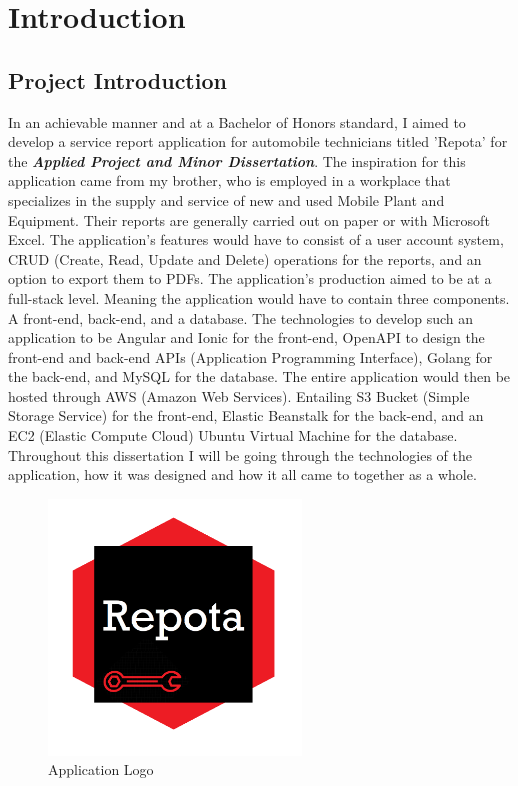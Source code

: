 \chapter{Introduction}

\section{Project Introduction}
In an achievable manner and at a Bachelor of Honors standard, I aimed to develop a service report application for automobile technicians titled 'Repota' for the \textbf{\textit{Applied Project and Minor Dissertation}}. The inspiration for this application came from my brother, who is employed in a workplace that specializes in the supply and service of new and used Mobile Plant and Equipment. Their reports are generally carried out on paper or with Microsoft Excel. The application's features would have to consist of a user account system, CRUD (Create, Read, Update and Delete) operations for the reports, and an option to export them to PDFs. The application's production aimed to be at a full-stack level. Meaning the application would have to contain three components. A front-end, back-end, and a database. The technologies to develop such an application to be Angular and Ionic for the front-end, OpenAPI to design the front-end and back-end APIs (Application Programming Interface), Golang for the back-end, and MySQL for the database. The entire application would then be hosted through AWS (Amazon Web Services). Entailing S3 Bucket (Simple Storage Service) for the front-end, Elastic Beanstalk for the back-end, and an EC2 (Elastic Compute Cloud) Ubuntu Virtual Machine for the database. Throughout this dissertation I will be going through the technologies of the application, how it was designed and how it all came to together as a whole. 

\begin{figure}[t]
    \caption{Application Logo}
    \label{image:RepotaLogo}
    \centering
    \includegraphics[width=0.6\textwidth]{images/repota/repotaApp_logo.png}
\end{figure}
\newpage
